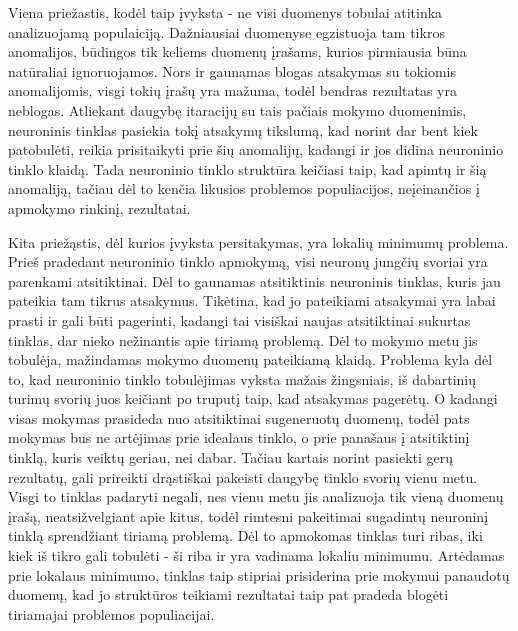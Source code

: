 \documentclass{VUMIFPSbakalaurinis}
\begin{document}
Viena priežastis, kodėl taip įvyksta - ne visi duomenys tobulai atitinka analizuojamą populaiciją. Dažniausiai duomenyse egzistuoja tam tikros anomalijos, būdingos tik keliems duomenų įrašams, kurios pirmiausia būna natūraliai ignoruojamos.
Nors ir gaunamas blogas atsakymas su tokiomis anomalijomis, visgi tokių įrašų yra mažuma, todėl bendras rezultatas yra neblogas.
Atliekant daugybę itaracijų su tais pačiais mokymo duomenimis, neuroninis tinklas pasiekia tokį atsakymų tikslumą, kad norint dar bent kiek patobulėti, reikia prisitaikyti prie šių anomalijų, kadangi ir jos didina neuroninio tinklo klaidą.
Tada neuroninio tinklo struktūra keičiasi taip, kad apimtų ir šią anomaliją, tačiau dėl to kenčia likusios problemos populiacijos, neįeinančios į apmokymo rinkinį, rezultatai.

Kita priežąstis, dėl kurios įvyksta persitakymas, yra lokalių minimumų problema.
Prieš pradedant neuroninio tinklo apmokymą, visi neuronų jungčių svoriai yra parenkami atsitiktinai.
Dėl to gaunamas atsitiktinis neuroninis tinklas, kuris jau pateikia tam tikrus atsakymus.
Tikėtina, kad jo pateikiami atsakymai yra labai prasti ir gali būti pagerinti, kadangi tai visiškai naujas atsitiktinai sukurtas tinklas, dar nieko nežinantis apie tiriamą problemą.
Dėl to mokymo metu jis tobulėja, mažindamas mokymo duomenų pateikiamą klaidą.
Problema kyla dėl to, kad neuroninio tinklo tobulėjimas vyksta mažais žingsniais, iš dabartinių turimų svorių juos keičiant po truputį taip, kad atsakymas pagerėtų.
O kadangi visas mokymas prasideda nuo atsitiktinai sugeneruotų duomenų, todėl pats mokymas bus ne artėjimas prie idealaus tinklo, o prie panašaus į atsitiktinį tinklą, kuris veiktų geriau, nei dabar.
Tačiau kartais norint pasiekti gerų rezultatų, gali prireikti drąstiškai pakeisti daugybę tinklo svorių vienu metu.
Visgi to tinklas padaryti negali, nes vienu metu jis analizuoja tik vieną duomenų įrašą, neatsižvelgiant apie kitus, todėl rimtesni pakeitimai sugadintų neuroninį tinklą sprendžiant tiriamą problemą.
Dėl to apmokomas tinklas turi ribas, iki kiek iš tikro gali tobulėti - ši riba ir yra vadinama lokaliu minimumu.
Artėdamas prie lokalaus minimumo, tinklas taip stipriai prisiderina prie mokymui panaudotų duomenų, kad jo struktūros teikiami rezultatai taip pat pradeda blogėti tiriamajai problemos populiacijai.
\end{document}
